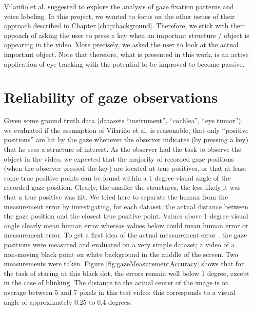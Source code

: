 Vilari\~no et al. suggested to explore the analysis of gaze fixation patterns and voice labeling. In this project, we wanted to focus on the other issues of their approach described in Chapter \ref{chap:background}. Therefore, we stick with their appoach of asking the user to press a key when an important structure / object is appearing in the video. More precisely, we asked the user to look at the actual important object. Note that therefore, what is presented in this work, is an active application of eye-tracking with the potential to be improved to become passive.

\section{Reliability of gaze observations}
Given some ground truth data (datasets ``instrument'', ``cochlea'', ``eye tumor''), we evaluated if the assumption of Vilari\~no et al.  is reasonable, that only ``positive positions'' are hit by the gaze whenever the observer indicates (by pressing a key) that he sees a structure of interest. 
As the observer had the task to observe the object in the video, we expected that the majority of recorded gaze positions (when the observer pressed the key) are located at true positives, or that at least some true positive points can be found within a 1 degree visual angle of the recorded gaze position. 
Clearly, the smaller the structures, the less likely it was that a true positive was hit. 
We tried here to separate the human from the measurement error by investigating, for each dataset, the actual distance between the gaze position and the closest true positive point. 
Values above 1 degree visual angle clearly mean human error whereas values below could mean human error or measurement error. 
To get a first idea of the actual measurement error , the gaze positions were measured and evaluated on a very simple dataset; a video of a non-moving black point on white background in the middle of the screen. 
Two measurements were taken. Figure \ref{fig:gazeMeasurementAccuracy} shows that for the task of staring at this black dot, the errors remain well below 1 degree, except in the case of blinking. 
The distance to the actual center of the image is on average between 5 and 7 pixels in this test video; this corresponds to a visual angle of approximately 0.25 to 0.4 degrees.

